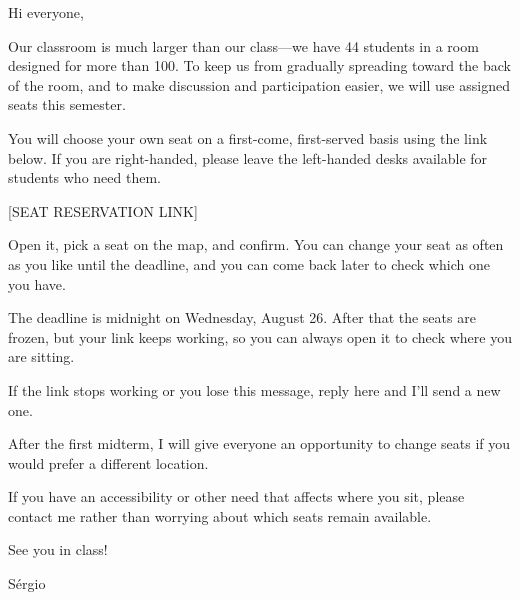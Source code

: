 Hi everyone,

Our classroom is much larger than our class—we have 44 students in a room designed for more than 100. To keep us from gradually spreading toward the back of the room, and to make discussion and participation easier, we will use assigned seats this semester.

You will choose your own seat on a first-come, first-served basis using the link below. If you are right-handed, please leave the left-handed desks available for students who need them.

[SEAT RESERVATION LINK]

Open it, pick a seat on the map, and confirm. You can change your seat as often
as you like until the deadline, and you can come back later to check which one
you have.

The deadline is midnight on Wednesday, August 26. After that the seats are frozen,
but your link keeps working, so you can always open it to check where you are
sitting.

If the link stops working or you lose this message, reply here and I'll send a
new one.

After the first midterm, I will give everyone an opportunity to change seats if you would prefer a different location.

If you have an accessibility or other need that affects where you sit, please contact me rather than worrying about which seats remain available.

See you in class!

Sérgio